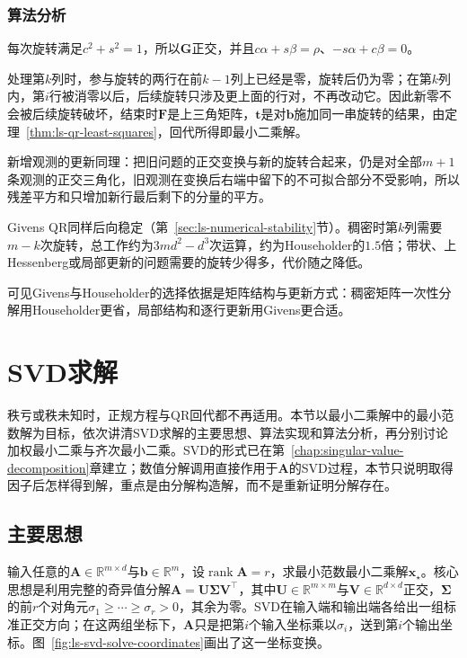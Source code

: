 \subsubsection{算法分析}
每次旋转满足$c^2+s^2=1$，所以$\bm G$正交，并且$c\alpha+s\beta=\rho$、$-s\alpha+c\beta=0$。

处理第$k$列时，参与旋转的两行在前$k-1$列上已经是零，旋转后仍为零；在第$k$列内，第$i$行被消零以后，后续旋转只涉及更上面的行对，不再改动它。因此新零不会被后续旋转破坏，结束时$\bm F$是上三角矩阵，$\bm t$是对$\bm b$施加同一串旋转的结果，由定理~\ref{thm:ls-qr-least-squares}，回代所得即最小二乘解。

新增观测的更新同理：把旧问题的正交变换与新的旋转合起来，仍是对全部$m+1$条观测的正交三角化，旧观测在变换后右端中留下的不可拟合部分不受影响，所以残差平方和只增加新行最后剩下的分量的平方。

Givens QR同样后向稳定（第~\ref{sec:ls-numerical-stability}节）。稠密时第$k$列需要$m-k$次旋转，总工作约为$3md^2-d^3$次运算，约为Householder的$1.5$倍；带状、上Hessenberg或局部更新的问题需要的旋转少得多，代价随之降低。

可见Givens与Householder的选择依据是矩阵结构与更新方式：稠密矩阵一次性分解用Householder更省，局部结构和逐行更新用Givens更合适。

\section{SVD求解}
\label{sec:ls-svd-solve}

秩亏或秩未知时，正规方程与QR回代都不再适用。本节以最小二乘解中的最小范数解为目标，依次讲清SVD求解的主要思想、算法实现和算法分析，再分别讨论加权最小二乘与齐次最小二乘。SVD的形式已在第~\ref{chap:singular-value-decomposition}章建立；数值分解调用直接作用于$\bm A$的SVD过程，本节只说明取得因子后怎样得到解，重点是由分解构造解，而不是重新证明分解存在。

\subsection{主要思想}

输入任意的$\bm A\in\mathbb R^{m\times d}$与$\bm b\in\mathbb R^m$，设$\operatorname{rank}\bm A=r$，求最小范数最小二乘解$\bm x_\star$。核心思想是利用完整的奇异值分解$\bm A=\bm U\bm\Sigma\bm V^\top$，其中$\bm U\in\mathbb R^{m\times m}$与$\bm V\in\mathbb R^{d\times d}$正交，$\bm\Sigma$的前$r$个对角元$\sigma_1\geq\cdots\geq\sigma_r>0$，其余为零。SVD在输入端和输出端各给出一组标准正交方向；在这两组坐标下，$\bm A$只是把第$i$个输入坐标乘以$\sigma_i$，送到第$i$个输出坐标。图~\ref{fig:ls-svd-solve-coordinates}画出了这一坐标变换。

